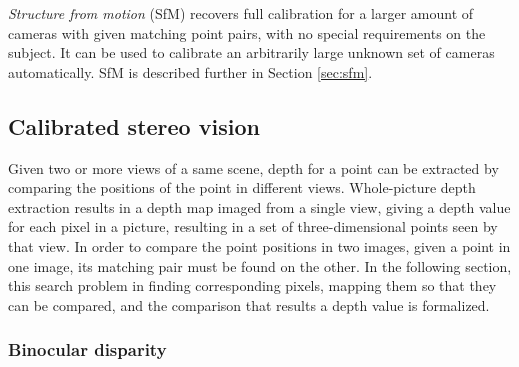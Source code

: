 \emph{Structure from motion} (SfM) recovers full calibration for a larger amount of cameras with given matching point pairs, with no special requirements on the subject.
It can be used to calibrate an arbitrarily large unknown set of cameras automatically.
SfM is described further in Section \ref{sec:sfm}.



\subsection{Calibrated stereo vision} %

Given two or more views of a same scene, depth for a point can be extracted by comparing the positions of the point in different views.
Whole-picture depth extraction results in a depth map imaged from a single view, giving a depth value for each pixel in a picture, resulting in a set of three-dimensional points seen by that view.
In order to compare the point positions in two images, given a point in one image, its matching pair must be found on the other.
In the following section, this search problem in finding corresponding pixels, mapping them so that they can be compared, and the comparison that results a depth value is formalized.


\subsubsection{Binocular disparity} \label{sec:binocular} %


